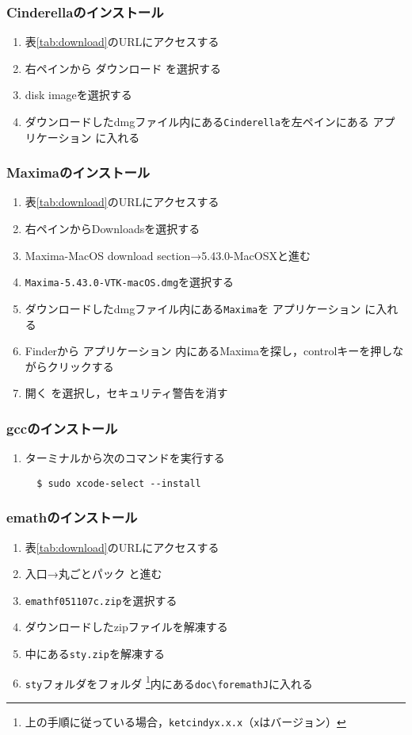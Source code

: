 \subsubsection{Cinderellaのインストール}
\begin{enumerate}
    \item 表\ref{tab:download}のURLにアクセスする
    \item 右ペインから ダウンロード を選択する
    \item disk imageを選択する
    \item ダウンロードしたdmgファイル内にある\verb|Cinderella|を左ペインにある アプリケーション に入れる
\end{enumerate}

\newpage
\subsubsection{Maximaのインストール}
\begin{enumerate}
    \item 表\ref{tab:download}のURLにアクセスする
    \item 右ペインからDownloadsを選択する
    \item Maxima-MacOS download section→5.43.0-MacOSXと進む
    \item \verb|Maxima-5.43.0-VTK-macOS.dmg|を選択する
    \item ダウンロードしたdmgファイル内にある\verb|Maxima|を アプリケーション に入れる
    \item Finderから アプリケーション 内にあるMaximaを探し，controlキーを押しながらクリックする
    \item 開く を選択し，セキュリティ警告を消す
\end{enumerate}

\subsubsection{gccのインストール}
\begin{enumerate}
    \item ターミナルから次のコマンドを実行する
          \begin{lstlisting}
  $ sudo xcode-select --install
          \end{lstlisting}
\end{enumerate}

\subsubsection{emathのインストール}
\begin{enumerate}
    \item 表\ref{tab:download}のURLにアクセスする
    \item 入口→丸ごとパック と進む
    \item \verb|emathf051107c.zip|を選択する
    \item ダウンロードしたzipファイルを解凍する
    \item 中にある\verb|sty.zip|を解凍する
    \item \verb|sty|フォルダを{\ketcindy}フォルダ
    \cprotect\footnote{上の手順に従っている場合，\verb|ketcindyx.x.x|（\verb|x|はバージョン）}内にある\verb|doc\foremathJ|に入れる
\end{enumerate}
